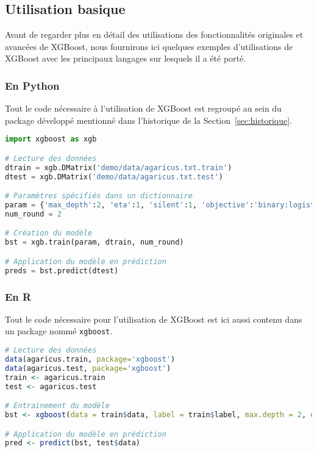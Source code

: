 \subsection{Utilisation basique}
Avant de regarder plus en détail des utilisations des fonctionnalités originales et avancées de XGBoost, nous fournirons ici quelques exemples d'utilisations de XGBoost avec les principaux langages sur lesquels il a été porté.

\subsubsection{En Python}
Tout le code nécessaire à l'utilisation de XGBoost est regroupé au sein du package développé mentionné dans l'historique de la Section~\ref{sec:historique}.

\begin{lstlisting}[language=Python]
import xgboost as xgb

# Lecture des données
dtrain = xgb.DMatrix('demo/data/agaricus.txt.train')
dtest = xgb.DMatrix('demo/data/agaricus.txt.test')

# Paramètres spécifiés dans un dictionnaire
param = {'max_depth':2, 'eta':1, 'silent':1, 'objective':'binary:logistic'}
num_round = 2

# Création du modèle
bst = xgb.train(param, dtrain, num_round)

# Application du modèle en prédiction
preds = bst.predict(dtest)
\end{lstlisting}

\subsubsection{En R}
Tout le code nécessaire pour l'utilisation de XGBoost est ici aussi contenu dans un package nommé \texttt{xgboost}.

\begin{lstlisting}[language=R]
# Lecture des données
data(agaricus.train, package='xgboost')
data(agaricus.test, package='xgboost')
train <- agaricus.train
test <- agaricus.test

# Entrainement du modèle
bst <- xgboost(data = train$data, label = train$label, max.depth = 2, eta = 1, nround = 2, nthread = 2, objective = "binary:logistic")

# Application du modèle en prédiction
pred <- predict(bst, test$data)
\end{lstlisting}

